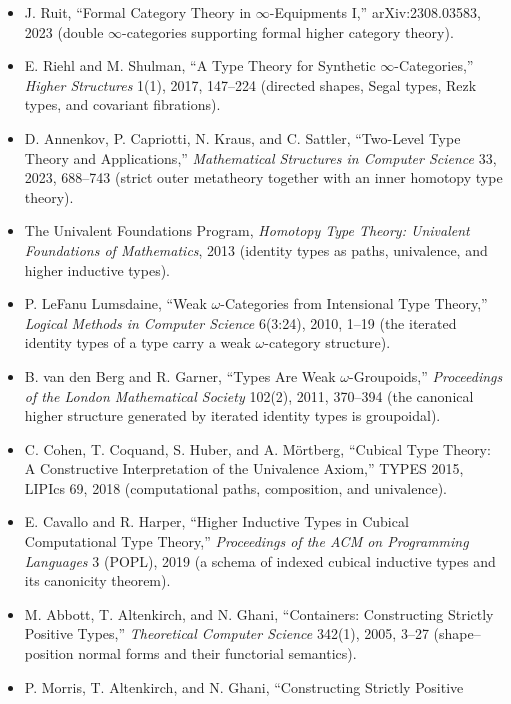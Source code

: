 \documentclass[11pt]{article}
\begin{document}
\begin{itemize}
  $\infty$-Categories,'' \emph{Algebraic \& Geometric Topology} 17(1), 2017,
  189--271 (modules and representables in a virtual $\infty$-equipment).
\item J. Ruit, ``Formal Category Theory in $\infty$-Equipments I,''
  arXiv:2308.03583, 2023 (double $\infty$-categories supporting formal higher
  category theory).
\item E. Riehl and M. Shulman, ``A Type Theory for Synthetic
  $\infty$-Categories,'' \emph{Higher Structures} 1(1), 2017, 147--224
  (directed shapes, Segal types, Rezk types, and covariant fibrations).
\item D. Annenkov, P. Capriotti, N. Kraus, and C. Sattler, ``Two-Level Type
  Theory and Applications,'' \emph{Mathematical Structures in Computer
  Science} 33, 2023, 688--743 (strict outer metatheory together with an inner
  homotopy type theory).
\item The Univalent Foundations Program, \emph{Homotopy Type Theory:
  Univalent Foundations of Mathematics}, 2013 (identity types as paths,
  univalence, and higher inductive types).
\item P. LeFanu Lumsdaine, ``Weak $\omega$-Categories from Intensional Type
  Theory,'' \emph{Logical Methods in Computer Science} 6(3:24), 2010,
  1--19 (the iterated identity types of a type carry a weak
  $\omega$-category structure).
\item B. van den Berg and R. Garner, ``Types Are Weak $\omega$-Groupoids,''
  \emph{Proceedings of the London Mathematical Society} 102(2), 2011,
  370--394 (the canonical higher structure generated by iterated identity
  types is groupoidal).
\item C. Cohen, T. Coquand, S. Huber, and A. M\"ortberg, ``Cubical Type
  Theory: A Constructive Interpretation of the Univalence Axiom,'' TYPES 2015,
  LIPIcs 69, 2018 (computational paths, composition, and univalence).
\item E. Cavallo and R. Harper, ``Higher Inductive Types in Cubical
  Computational Type Theory,'' \emph{Proceedings of the ACM on Programming
  Languages} 3 (POPL), 2019 (a schema of indexed cubical inductive types and
  its canonicity theorem).
\item M. Abbott, T. Altenkirch, and N. Ghani, ``Containers: Constructing
  Strictly Positive Types,'' \emph{Theoretical Computer Science} 342(1), 2005,
  3--27 (shape--position normal forms and their functorial semantics).
\item P. Morris, T. Altenkirch, and N. Ghani, ``Constructing Strictly Positive

\end{itemize}
\end{document}
